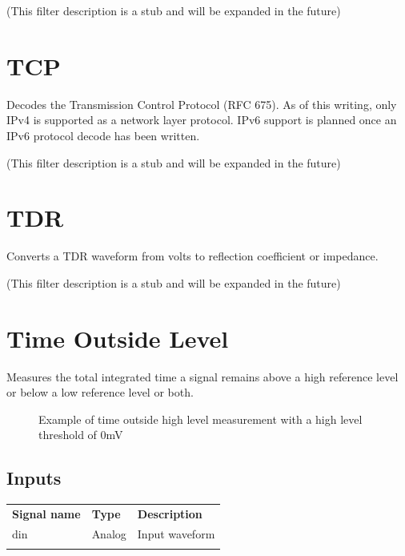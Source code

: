(This filter description is a stub and will be expanded in the future)

\pagebreak
\section{TCP}

Decodes the Transmission Control Protocol (RFC 675). As of this writing, only IPv4 is supported as a network layer
protocol. IPv6 support is planned once an IPv6 protocol decode has been written.

(This filter description is a stub and will be expanded in the future)

\pagebreak
\section{TDR}

Converts a TDR waveform from volts to reflection coefficient or impedance.

(This filter description is a stub and will be expanded in the future)

\pagebreak
\section{Time Outside Level}

Measures the total integrated time a signal remains above a high reference level or below a low reference level or both.

\begin{figure}[h]
	\centering
	\caption{Example of time outside high level measurement with a high level threshold of 0mV}
	\label{filter_timeoutsidelevel}
	\end{figure}

\subsection{Inputs}

\begin{tabularx}{16cm}{llX}
\thickhline
\textbf{Signal name} & \textbf{Type} & \textbf{Description} \\
\thickhline
din & Analog & Input waveform \\
\thickhline
\end{tabularx}

